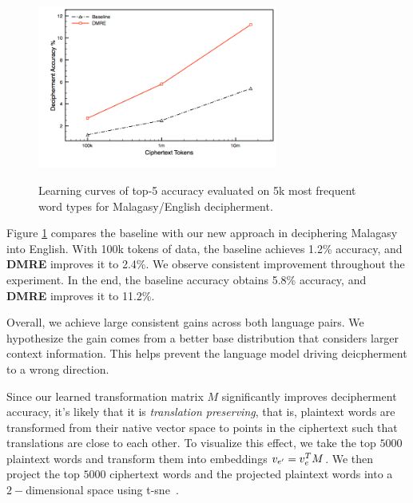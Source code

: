  \begin{figure}[!ht]
  \centering
  \includegraphics[width=3.1in,height=2.4in]{mlg_en_curve}
  \caption{Learning curves of top-5 accuracy evaluated on 5k most frequent word types for Malagasy/English decipherment.}
\label{mlg-en-curve}
\end{figure}

Figure \ref{mlg-en-curve} compares the baseline with our new approach in deciphering Malagasy into English. With 100k tokens of data, the baseline achieves 1.2\% accuracy, and \textbf{DMRE} improves it to 2.4\%.  We observe consistent improvement throughout the experiment. In the end, the baseline accuracy obtains 5.8\% accuracy, and \textbf{DMRE} improves it to 11.2\%.

Overall, we achieve large consistent gains across both language pairs. We hypothesize the gain comes from a better base distribution that considers larger context information. This helps prevent the language model driving deicpherment to a wrong direction. 

Since our learned transformation matrix $M$ significantly improves decipherment accuracy, it's likely that it is \emph{translation preserving}, that is, plaintext words are transformed from their native vector space to points in the ciphertext such that translations are close to each other. To visualize this effect, we take the top $5000$ plaintext words and transform them into embeddings $v_{e'} = v_{e}^T M$. We then project the top $5000$ ciphertext words and the projected plaintext words into a $2-$dimensional space using t-sne~\cite{van2008visualizing}. 

